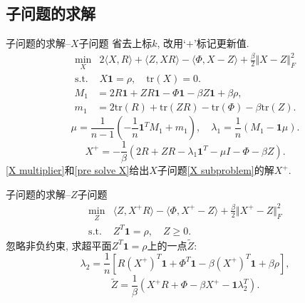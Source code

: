\documentclass{beamer}
\newcommand*{\beq}[1]{{\textcolor[rgb]{0,0,0.67}{\eqref{#1}}}}
\newcommand{\trace}{\mathrm{tr}}
\newcommand{\st}{\mathrm{s.t.}}
\newcommand{\one}{\mathbf{1}}
\begin{document}
\subsection{子问题的求解}
\begin{frame}{子问题的求解--$X$子问题}
省去上标$k$, 改用`$+$'标记更新值. 
\begin{equation}
	\begin{array}{rl}
		\min\limits_X & 2\langle X,R\rangle+\langle Z,XR\rangle-\langle\Phi,X-Z\rangle+\frac{\beta}{2}\Vert X-Z\Vert_F^2\\
		\st & X\one=\rho,\quad\trace(X)=0.
	\end{array}
	\label{X subproblem}
\end{equation}
$$\begin{aligned}
	M_1&=2R\one+ZR\one-\Phi\one-\beta Z\one+\beta\rho,\\
	m_1&=2\trace(R)+\trace(ZR)-\trace(\Phi)-\beta\trace(Z).
\end{aligned}$$
\begin{equation}
	\mu=\frac{1}{n-1}\left(-\frac{1}{n}\one^TM_1+m_1\right),\quad\lambda_1=\frac{1}{n}(M_1-\one\mu).\label{X multiplier}
\end{equation}
\begin{equation}
	X^+=-\frac{1}{\beta}(2R+ZR-\lambda_1\one^T-\mu I-\Phi-\beta Z).\label{pre solve X}
\end{equation}
\beq{X multiplier}和\beq{pre solve X}给出$X$子问题\beq{X subproblem}的解$X^+$.
\end{frame}

\begin{frame}{子问题的求解--$Z$子问题}
\begin{equation}
	\begin{array}{rl}
		\min\limits_Z & \langle Z,X^+R\rangle-\langle\Phi,X^+-Z\rangle+\frac{\beta}{2}\Vert X^+-Z\Vert_F^2\\
		\st & Z^T\one=\rho,\quad Z\ge0.
	\end{array}
	\label{Z subproblem}
\end{equation}
忽略非负约束, 求超平面$Z^T\one=\rho$上的一点$\widetilde Z$:
$$\lambda_2=\frac{1}{n}\left[R\left(X^+\right)^T\one+\Phi^T\one-\beta\left(X^+\right)^T\one+\beta\rho\right],$$
$$\widetilde Z=\frac{1}{\beta}(X^+R+\Phi-\beta X^+-\one\lambda_2^T).$$
\end{frame}
\end{document}
